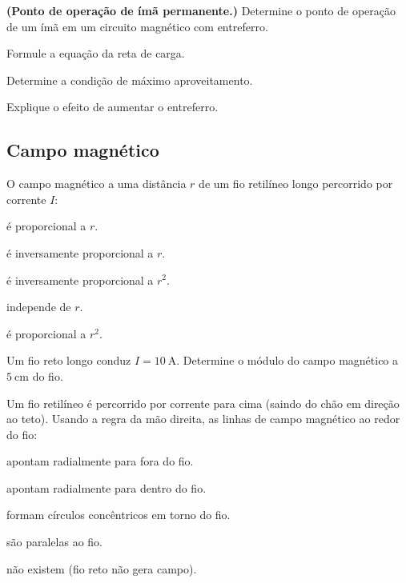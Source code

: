 \begin{questao}[4]{}

\textbf{(Ponto de operação de ímã permanente.)} Determine o ponto de operação
de um ímã em um circuito magnético com entreferro.
\begin{itensq}
\item Formule a equação da reta de carga.
\item Determine a condição de máximo aproveitamento.
\item Explique o efeito de aumentar o entreferro.
\end{itensq}


\end{questao}


\subsection{Campo magnético}

\blocofixacao
\begin{questao}[1]{}

O campo magnético a uma distância $r$ de um fio retilíneo longo percorrido por
corrente $I$:
\begin{alternativas}
\item é proporcional a $r$.
\item é inversamente proporcional a $r$.
\item é inversamente proporcional a $r^2$.
\item independe de $r$.
\item é proporcional a $r^2$.
\end{alternativas}


\end{questao}
\begin{questao}[1]{}

Um fio reto longo conduz $I = \SI{10}{\ampere}$. Determine o módulo do campo
magnético a $\SI{5}{\centi\meter}$ do fio.


\end{questao}
\begin{questao}[1]{}

Um fio retilíneo é percorrido por corrente para cima (saindo do chão em direção ao
teto). Usando a regra da mão direita, as linhas de campo magnético ao redor do fio:
\begin{alternativas}
\item apontam radialmente para fora do fio.
\item apontam radialmente para dentro do fio.
\item formam círculos concêntricos em torno do fio.
\item são paralelas ao fio.
\item não existem (fio reto não gera campo).
\end{alternativas}


\end{questao}


